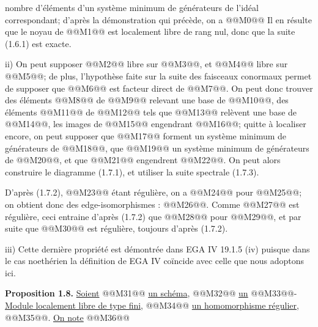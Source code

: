 
nombre d'éléments d'un système minimum de générateurs de l'idéal correspondant; d'après la démonstration qui précède, on a
@@M0@@
Il en résulte que le noyau de @@M1@@ est localement libre de rang nul, donc que la suite (1.6.1) est exacte.

ii) On peut supposer @@M2@@ libre sur @@M3@@, et @@M4@@ libre sur @@M5@@; de plus, l'hypothèse faite sur la suite des faisceaux conormaux permet de supposer que @@M6@@ est facteur direct de @@M7@@. On peut donc trouver des éléments @@M8@@ de @@M9@@ relevant une base de @@M10@@, des éléments @@M11@@ de @@M12@@ tels que @@M13@@ relèvent une base de @@M14@@, les images de @@M15@@ engendrant @@M16@@; quitte à localiser encore, on peut supposer que @@M17@@ forment un système minimum de générateurs de @@M18@@, que @@M19@@ un système minimum de générateurs de @@M20@@, et que @@M21@@ engendrent @@M22@@. On peut alors construire le diagramme (1.7.1), et utiliser la suite spectrale (1.7.3).

D'après (1.7.2), @@M23@@ étant régulière, on a @@M24@@ pour @@M25@@; on obtient donc des edge-isomorphismes : @@M26@@. Comme @@M27@@ est régulière, ceci entraine d'après (1.7.2) que @@M28@@ pour @@M29@@, et par suite que @@M30@@ est régulière, toujours d'après (1.7.2).

iii) Cette dernière propriété est démontrée dans EGA IV 19.1.5 (iv) puisque dans le cas noethérien la définition de EGA IV coïncide avec celle que nous adoptons ici.

\textbf{Proposition 1.8.} \uline{Soient} @@M31@@ \uline{un schéma}, @@M32@@ \uline{un} @@M33@@-\uline{Module localement libre de type fini}, @@M34@@ \uline{un homomorphisme régulier}, @@M35@@. \uline{On note} @@M36@@
